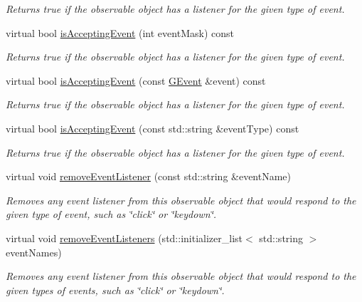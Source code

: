 \begin{DoxyCompactItemize}
\begin{DoxyCompactList}\small\item\em Returns true if the observable object has a listener for the given type of event. \end{DoxyCompactList}\item 
virtual bool \mbox{\hyperlink{classGObservable_aeec1adc19aa0f33de62390686ee1382c}{is\+Accepting\+Event}} (int event\+Mask) const
\begin{DoxyCompactList}\small\item\em Returns true if the observable object has a listener for the given type of event. \end{DoxyCompactList}\item 
virtual bool \mbox{\hyperlink{classGObservable_aa31c73145a29dcb92848a92e0cfaea41}{is\+Accepting\+Event}} (const \mbox{\hyperlink{classGEvent}{G\+Event}} \&event) const
\begin{DoxyCompactList}\small\item\em Returns true if the observable object has a listener for the given type of event. \end{DoxyCompactList}\item 
virtual bool \mbox{\hyperlink{classGObservable_a3b1c689267eda44e65a2213e7de38b23}{is\+Accepting\+Event}} (const std\+::string \&event\+Type) const
\begin{DoxyCompactList}\small\item\em Returns true if the observable object has a listener for the given type of event. \end{DoxyCompactList}\item 
virtual void \mbox{\hyperlink{classGObservable_acbcf1ed3a851ad8a3c17ef38d86b481d}{remove\+Event\+Listener}} (const std\+::string \&event\+Name)
\begin{DoxyCompactList}\small\item\em Removes any event listener from this observable object that would respond to the given type of event, such as \char`\"{}click\char`\"{} or \char`\"{}keydown\char`\"{}. \end{DoxyCompactList}\item 
virtual void \mbox{\hyperlink{classGObservable_af51cc35c29a1bd1908609d432decdbb6}{remove\+Event\+Listeners}} (std\+::initializer\+\_\+list$<$ std\+::string $>$ event\+Names)
\begin{DoxyCompactList}\small\item\em Removes any event listener from this observable object that would respond to the given types of events, such as \char`\"{}click\char`\"{} or \char`\"{}keydown\char`\"{}. \end{DoxyCompactList}\item 

\end{DoxyCompactItemize}
